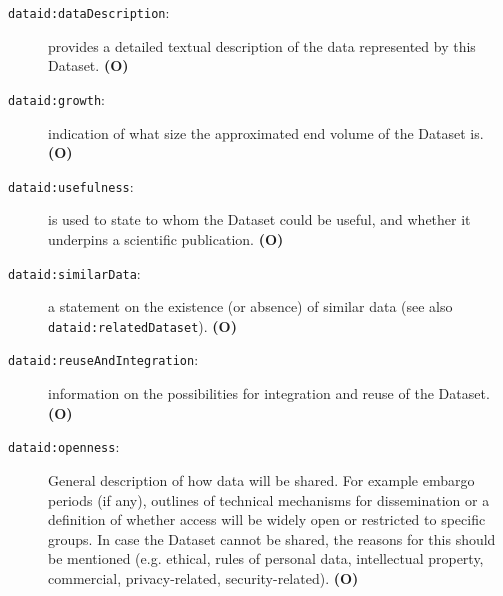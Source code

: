 \documentclass[a4paper,english,twoside,BCOR1.5cm,headsepline,DIV12,appendixprefix,final,12pt]{scrbook}
\newcommand{\prop}[1]{{{\texttt{#1}}}}
\begin{document}
\begin{description}
\item[\prop{dataid:dataDescription}:] provides a detailed textual description of the data represented by this Dataset. \textbf{(O)}
\item[\prop{dataid:growth}:] indication of what size the approximated end volume of the Dataset is. \textbf{(O)}
\item[\prop{dataid:usefulness}:] is used to state to whom the Dataset could be useful, and whether it underpins a scientific publication. \textbf{(O)}
\item[\prop{dataid:similarData}:] a statement on the existence (or absence) of similar data (see also \prop{dataid:relatedDataset}). \textbf{(O)}
\item[\prop{dataid:reuseAndIntegration}:] information on the possibilities for integration and reuse of the Dataset. \textbf{(O)}
\item[\prop{dataid:openness}:] General description of how data will be shared. For example embargo periods (if any), outlines of technical mechanisms for dissemination or a definition of whether access will be widely open or restricted to specific groups. In case the Dataset cannot be shared, the reasons for this should be mentioned (e.g. ethical, rules of personal data, intellectual property, commercial, privacy-related, security-related). \textbf{(O)}
\end{description}
\end{document}

